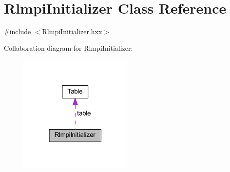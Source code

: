 \hypertarget{classRlmpiInitializer}{}\section{Rlmpi\+Initializer Class Reference}
\label{classRlmpiInitializer}


{\ttfamily \#include $<$Rlmpi\+Initializer.\+hxx$>$}



Collaboration diagram for Rlmpi\+Initializer\+:
\nopagebreak
\begin{figure}[H]
\begin{center}
\leavevmode
\includegraphics[width=160pt]{classRlmpiInitializer__coll__graph}
\end{center}
\end{figure}
